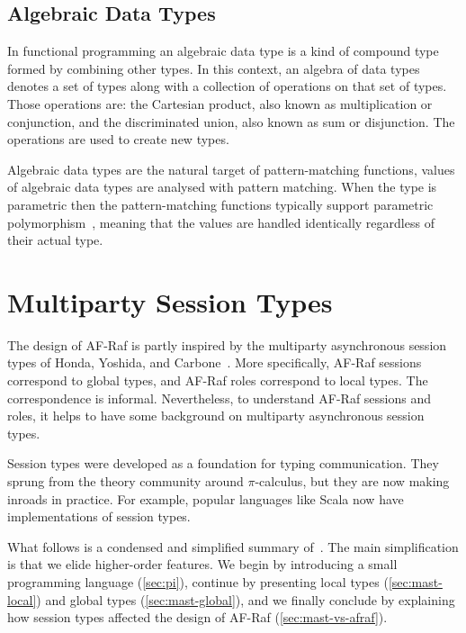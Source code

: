 \documentclass[a4paper,12pt,oneside,fleqn]{book} %
\newcommand{\todo}[1]{[\textcolor{red}{TODO}: #1]}
\begin{document}
\section{Algebraic Data Types}\label{sec:adt} %

In functional programming an algebraic data type is a kind of compound type
formed by combining other types. In this context, an algebra of data types
denotes a set of types along with a collection of operations on that set of
types. Those operations are: the Cartesian product, also known as
multiplication or conjunction, and the discriminated union, also known as
sum or disjunction. The operations are used to create new types.

Algebraic data types are the natural target of pattern-matching functions,
values of algebraic data types are analysed with pattern matching.  When
the type is parametric then the pattern-matching functions typically
support parametric polymorphism~\cite{AlgebraicDT09}, meaning that the
values are handled identically regardless of their actual type.



\chapter{Multiparty Session Types}\label{ch:multiparty} %

The design of AF-Raf is partly inspired
  by the multiparty asynchronous session types
  of Honda, Yoshida, and Carbone~\cite{DBLP:journals/jacm/HondaYC16}.
More specifically,
  AF-Raf sessions correspond to global types,
  and AF-Raf roles correspond to local types.
The correspondence is informal.
Nevertheless,
  to understand AF-Raf sessions and roles,
  it helps to have some background on multiparty asynchronous session types.

Session types were developed as a foundation for typing communication.
They sprung from the theory community around $\pi$-calculus,
  but they are now making inroads in practice.
For example, popular languages like Scala
  now have implementations of session types.

What follows is a condensed and simplified summary
  of~\cite{DBLP:journals/jacm/HondaYC16}.
The main simplification is that we elide higher-order features.
We begin by introducing a small programming language (\autoref{sec:pi}),
  continue by presenting
    local types (\autoref{sec:mast-local})
    and global types (\autoref{sec:mast-global}),
  and we finally conclude by explaining how session types affected the
    design of AF-Raf (\autoref{sec:mast-vs-afraf}).
\end{document}
